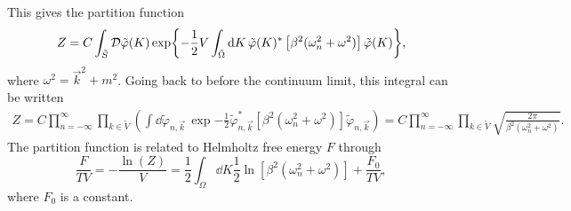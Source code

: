 This gives the partition function 
\begin{equation*}
    Z = C \int_{\tilde S} \mathcal{D} \tilde \varphi(K) 
    \exp{
        -  \frac{1}{2} V \int_{\tilde \Omega} \dd K \, 
        \tilde \varphi(K)^* \left[\beta^2 (\omega_n^2+ \omega^2)\right] \tilde \varphi(K)
    },
\end{equation*}
where $\omega^2 = \vec k^2 + m^2$.
Going back to before the continuum limit, this integral can be written
\begin{align*}
    Z = C \prod_{n=-\infty}^\infty \prod_{k \in \tilde V}
    \left(
        \int \dd \tilde \varphi_{n, \vec k} \,
        \exp{
            - \frac{1}{2} \tilde \varphi_{n, \vec k}^*
            \left[\beta^2 (\omega_n^2+ \omega^2)\right] 
            \tilde \varphi_{n, \vec k}
            }
    \right)
    = 
    C \prod_{n=-\infty}^\infty \prod_{k \in \tilde V} 
    \sqrt{\frac{2 \pi}{\beta^2 (\omega_n^2 + \omega^2)}}.
\end{align*}
The partition function is related to Helmholtz free energy $F$ through
\begin{equation*}
    \frac{F}{T V}= - \frac{\ln(Z)}{V} = \frac{1}{2} \int_\Omega \dd K \frac{1}{2} \ln[\beta^2(\omega_n^2 + \omega^2)] + \frac{F_0}{TV},
\end{equation*}
where $F_0$ is a constant.

